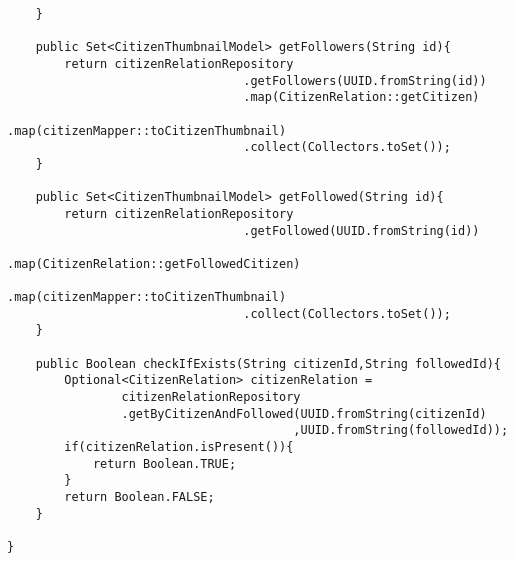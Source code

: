 \begin {lstlisting}
	}
	
	public Set<CitizenThumbnailModel> getFollowers(String id){
		return citizenRelationRepository
								 .getFollowers(UUID.fromString(id))
								 .map(CitizenRelation::getCitizen)
								 .map(citizenMapper::toCitizenThumbnail)
								 .collect(Collectors.toSet());
	}
	
	public Set<CitizenThumbnailModel> getFollowed(String id){
		return citizenRelationRepository
								 .getFollowed(UUID.fromString(id))
								 .map(CitizenRelation::getFollowedCitizen)
								 .map(citizenMapper::toCitizenThumbnail)
								 .collect(Collectors.toSet());
	}
	
	public Boolean checkIfExists(String citizenId,String followedId){
		Optional<CitizenRelation> citizenRelation = 
				citizenRelationRepository
				.getByCitizenAndFollowed(UUID.fromString(citizenId)
                                        ,UUID.fromString(followedId));
		if(citizenRelation.isPresent()){
			return Boolean.TRUE;
		}
		return Boolean.FALSE;
	}

}
\end{lstlisting}
